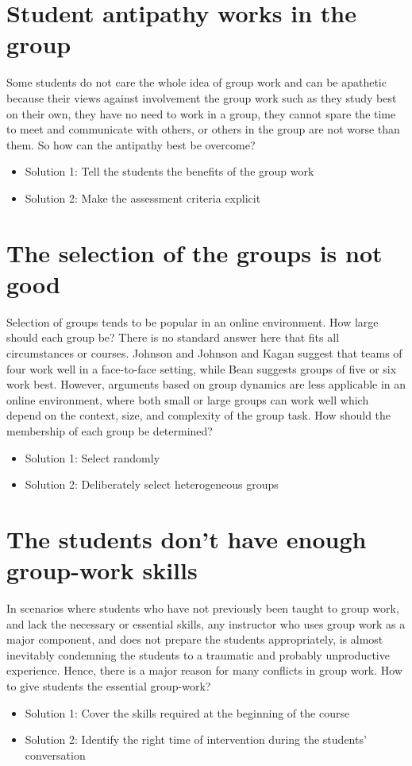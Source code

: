 \documentclass[letterpaper%
, twoside%
, 12pt%
,these%
, english%
,creativecommons,hyperref, withAlgo2e %
]{thETS}
\begin{document}
\section{Student antipathy works in the group}
Some students do not care the whole idea of group work and can be apathetic because their views against involvement the group work such as they study best on their own, they have no need to work in a group, they cannot spare the time to meet and communicate with others, or others in the group are not worse than them. So how can the antipathy best be overcome?
\begin{itemize}
	\item Solution 1: Tell the students the benefits of the group work
	\item Solution 2: Make the assessment criteria explicit
\end{itemize}

\section{The selection of the groups is not good}
Selection of groups tends to be popular in an online environment.  How large should each group be? There is no standard answer here that fits all circumstances or courses. Johnson and Johnson
\cite{Johnson} and Kagan \cite{Kagan} suggest that teams of four work well in a face-to-face setting, while Bean \cite{Bean}
suggests groups of five or six work best. However, arguments based on group dynamics are less applicable in an online environment, where both small or large groups can work well which depend on the context, size, and complexity of the group task. How should the membership of each group be determined?
\begin{itemize}
	\item Solution 1: Select randomly
	\item Solution 2: Deliberately select heterogeneous groups
\end{itemize}
\section{The students don't have enough group-work skills}
In scenarios where students who have not previously been taught to group work, and lack  the necessary or essential skills,
any instructor who uses group work as a major component, and does not prepare the students appropriately, is almost
inevitably condemning the students to a traumatic and probably unproductive experience. Hence, there is a major reason for many conflicts in group work. How to give students the essential group-work?
\begin{itemize}
	\item Solution 1: Cover the skills required at the beginning of the course
	\item Solution 2: Identify the right time of intervention  during the students' conversation
\end{itemize}
\end{document}
